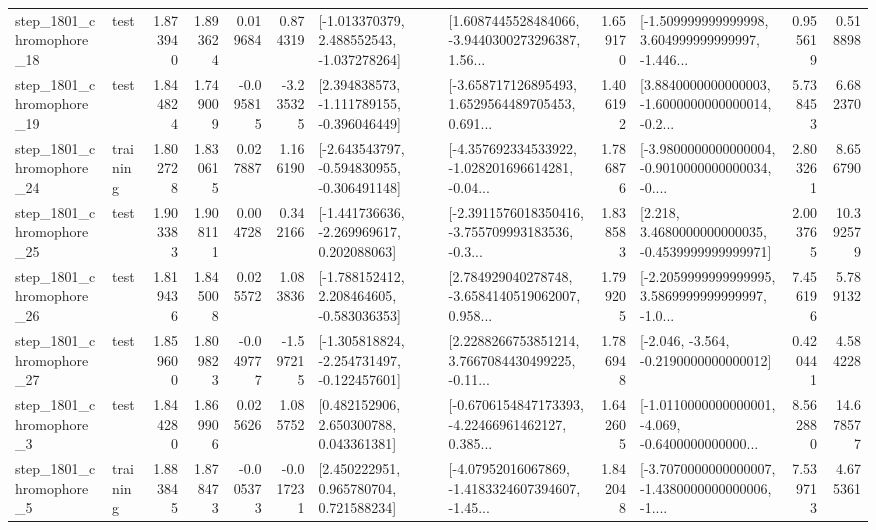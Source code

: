 \begin{tabular}{llrrrrllrlrr}
 step\_1801\_chromophore\_18 &      test &      1.873940 &    1.893624 &      0.019684 &  0.874319 &   [-1.013370379, 2.488552543, -1.037278264] &  [1.6087445528484066, -3.9440300273296387, 1.56... &       1.659170 &  [-1.509999999999998, 3.604999999999997, -1.446... &            0.955619 &          0.518898 \\
 step\_1801\_chromophore\_19 &      test &      1.844824 &    1.749009 &     -0.095815 & -3.235325 &   [2.394838573, -1.111789155, -0.396046449] &  [-3.658717126895493, 1.6529564489705453, 0.691... &       1.406192 &  [3.8840000000000003, -1.6000000000000014, -0.2... &            5.738453 &          6.682370 \\
 step\_1801\_chromophore\_24 &  training &      1.802728 &    1.830615 &      0.027887 &  1.166190 &  [-2.643543797, -0.594830955, -0.306491148] &  [-4.357692334533922, -1.028201696614281, -0.04... &       1.786876 &  [-3.9800000000000004, -0.9010000000000034, -0.... &            2.803261 &          8.656790 \\
 step\_1801\_chromophore\_25 &      test &      1.903383 &    1.908111 &      0.004728 &  0.342166 &   [-1.441736636, -2.269969617, 0.202088063] &  [-2.3911576018350416, -3.755709993183536, -0.3... &       1.838583 &   [2.218, 3.4680000000000035, -0.4539999999999971] &            2.003765 &         10.392579 \\
 step\_1801\_chromophore\_26 &      test &      1.819436 &    1.845008 &      0.025572 &  1.083836 &   [-1.788152412, 2.208464605, -0.583036353] &  [2.784929040278748, -3.6584140519062007, 0.958... &       1.799205 &  [-2.2059999999999995, 3.5869999999999997, -1.0... &            7.456196 &          5.789132 \\
 step\_1801\_chromophore\_27 &      test &      1.859600 &    1.809823 &     -0.049777 & -1.597215 &  [-1.305818824, -2.254731497, -0.122457601] &  [2.2288266753851214, 3.7667084430499225, -0.11... &       1.786948 &              [-2.046, -3.564, -0.2190000000000012] &            0.420441 &          4.584228 \\
  step\_1801\_chromophore\_3 &      test &      1.844280 &    1.869906 &      0.025626 &  1.085752 &     [0.482152906, 2.650300788, 0.043361381] &  [-0.6706154847173393, -4.22466961462127, 0.385... &       1.642605 &  [-1.0110000000000001, -4.069, -0.6400000000000... &            8.562880 &         14.678577 \\
  step\_1801\_chromophore\_5 &  training &      1.883845 &    1.878473 &     -0.005373 & -0.017231 &     [2.450222951, 0.965780704, 0.721588234] &  [-4.07952016067869, -1.4183324607394607, -1.45... &       1.842048 &  [-3.7070000000000007, -1.4380000000000006, -1.... &            7.539713 &          4.675361 \\

\end{tabular}
